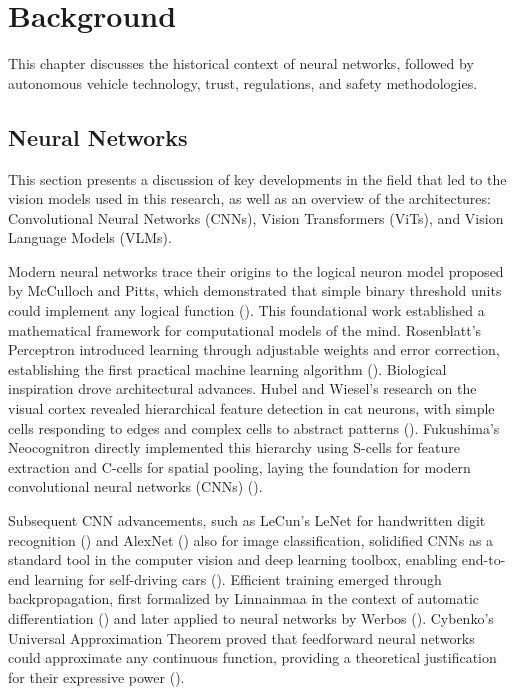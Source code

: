 \chapter{Background}

This chapter discusses the historical context of neural networks, followed by autonomous vehicle technology, trust, regulations, and safety methodologies.

\section{Neural Networks}
This section presents a discussion of key developments in the field that led to the vision models used in this research, as well as an overview of the architectures: Convolutional Neural Networks (CNNs), Vision Transformers (ViTs), and Vision Language Models (VLMs).

Modern neural networks trace their origins to the logical neuron model proposed by McCulloch and Pitts, which demonstrated that simple binary threshold units could implement any logical function (\cite{mcculloch1943logical}). This foundational work established a mathematical framework for computational models of the mind. Rosenblatt's Perceptron introduced learning through adjustable weights and error correction, establishing the first practical machine learning algorithm (\cite{rosenblatt1958perceptron}).
Biological inspiration drove architectural advances. Hubel and Wiesel's research on the visual cortex revealed hierarchical feature detection in cat neurons, with simple cells responding to edges and complex cells to abstract patterns (\cite{hubel1962receptive}). Fukushima's Neocognitron directly implemented this hierarchy using S-cells for feature extraction and C-cells for spatial pooling, laying the foundation for modern convolutional neural networks (CNNs) (\cite{fukushima1980neocognitron}).

Subsequent CNN advancements, such as LeCun's LeNet for handwritten digit recognition (\cite{lecun1998gradient}) and AlexNet (\cite{krizhevsky2012imagenet}) also for image classification, solidified CNNs as a standard tool in the computer vision and deep learning toolbox, enabling end-to-end learning for self-driving cars (\cite{bojarski2016end}).
Efficient training emerged through backpropagation, first formalized by Linnainmaa in the context of automatic differentiation (\cite{linnainmaa1970cumulative}) and later applied to neural networks by Werbos (\cite{werbos1974beyond}). Cybenko's Universal Approximation Theorem proved that feedforward neural networks could approximate any continuous function, providing a theoretical justification for their expressive power (\cite{cybenko1989approximation}).


